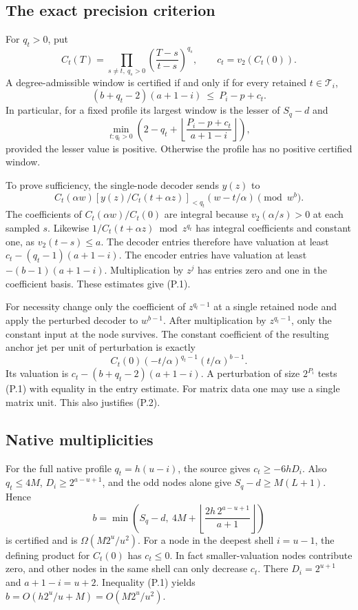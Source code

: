 \documentclass[
  11pt,
]{article}
\begin{document}
\subsection{The exact precision
criterion}\label{the-exact-precision-criterion}

For \(q_t>0\), put \[
 C_t(T)=\prod_{s\ne t,\ q_s>0}
       \left(\frac{T-s}{t-s}\right)^{q_s},\qquad c_t=v_2(C_t(0)).
\] A degree-admissible window is certified if and only if for every
retained \(t\in\mathcal T_i\), \[
       (b+q_t-2)(a+1-i)\ \le\ P_i-p+c_t.                 \tag{P.1}
\] In particular, for a fixed profile its largest window is the lesser
of \(S_q-d\) and \[
 \min_{t:q_t>0}\left(2-q_t+
 \left\lfloor\frac{P_i-p+c_t}{a+1-i}\right\rfloor\right),
                                                               \tag{P.2}
\] provided the lesser value is positive. Otherwise the profile has no
positive certified window.

To prove sufficiency, the single-node decoder sends \(y(z)\) to \[
 C_t(\alpha w)
 \left[ y(z)/C_t(t+\alpha z)\right]_{<q_t}
     (w-t/\alpha)\pmod{w^b}.
\] The coefficients of \(C_t(\alpha w)/C_t(0)\) are integral because
\(v_2(\alpha/s)>0\) at each sampled \(s\). Likewise
\(1/C_t(t+\alpha z)\bmod z^{q_t}\) has integral coefficients and
constant one, as \(v_2(t-s)\le a\). The decoder entries therefore have
valuation at least \(c_t-(q_t-1)(a+1-i)\). The encoder entries have
valuation at least \(-(b-1)(a+1-i)\). Multiplication by \(z^j\) has
entries zero and one in the coefficient basis. These estimates give
(P.1).

For necessity change only the coefficient of \(z^{q_t-1}\) at a single
retained node and apply the perturbed decoder to \(w^{b-1}\). After
multiplication by \(z^{q_t-1}\), only the constant input at the node
survives. The constant coefficient of the resulting anchor jet per unit
of perturbation is exactly \[
      C_t(0)(-t/\alpha)^{q_t-1}(t/\alpha)^{b-1}.          \tag{P.3}
\] Its valuation is \(c_t-(b+q_t-2)(a+1-i)\). A perturbation of size
\(2^{P_i}\) tests (P.1) with equality in the entry estimate. For matrix
data one may use a single matrix unit. This also justifies (P.2).

\subsection{Native multiplicities}\label{native-multiplicities}

For the full native profile \(q_t=h(u-i)\), the source gives
\(c_t\ge-6hD_i\). Also \(q_t\le4M\), \(D_i\ge2^{a-u+1}\), and the odd
nodes alone give \(S_q-d\ge M(L+1)\). Hence \[
 b=\min\!\left(S_q-d,\ 4M+
          \left\lfloor \frac{2h\,2^{a-u+1}}{a+1}\right\rfloor\right)
\] is certified and is \(\Omega(M2^u/u^2)\). For a node in the deepest
shell \(i=u-1\), the defining product for \(C_t(0)\) has \(c_t\le0\). In
fact smaller-valuation nodes contribute zero, and other nodes in the
same shell can only decrease \(c_t\). There \(D_i=2^{u+1}\) and
\(a+1-i=u+2\). Inequality (P.1) yields \(b=O(h2^u/u+M)=O(M2^u/u^2)\).
\end{document}
